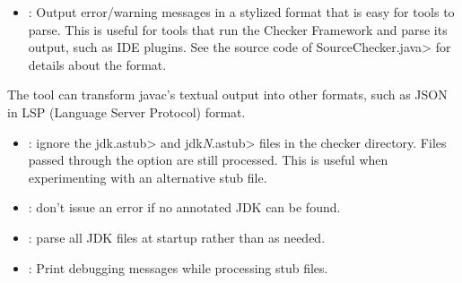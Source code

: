 
\begin{itemize}

\item {}: Output error/warning messages in a
  stylized format that is easy for tools to parse.  This is useful for
  tools that run the Checker Framework and parse its output, such as IDE
  plugins.  See the source code of \<SourceChecker.java> for details about
  the format.

\end{itemize}

The
tool can transform javac's textual output into other formats, such as JSON
in LSP (Language Server Protocol) format.



\begin{itemize}

\item {}:
  ignore the \<jdk.astub> and \<jdk\emph{N}.astub> files in the checker directory. Files passed
  through the  option are still processed. This is useful
  when experimenting with an alternative stub file.

\item {}:
  don't issue an error if no annotated JDK can be found.

\item {}:
  parse all JDK files at startup rather than as needed.

\item {}:
  Print debugging messages while processing stub files.

\end{itemize}


